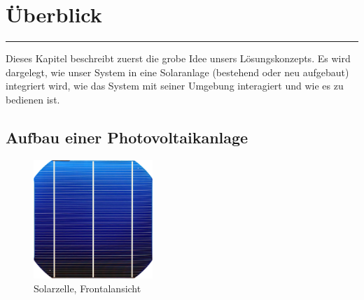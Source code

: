 \chapter{\"Uberblick}
\label{chap:uberblick}

{%
    \small
    \startcontents[chapters]
}

\plainbreak{1}

Dieses Kapitel  beschreibt zuerst die grobe  Idee unsers L\"osungskonzepts. Es
wird  dargelegt, wie  unser System  in  eine Solaranlage  (bestehend oder  neu
aufgebaut) integriert wird, wie das System mit seiner Umgebung interagiert und
wie es zu bedienen ist.


\section{Aufbau einer Photovoltaikanlage}
\label{sec:solaranlage:aufbau}

\begin{figure}
    \centering
    \includegraphics[width=0.4\textwidth]{images/solar-facility/cell--400px.png}
    \caption{Solarzelle, Frontalansicht \cite{ref:pvcell:wikipedia}}
    \label{fig:pvcell:front}
\end{figure}

